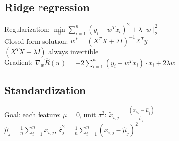 \subsection*{Ridge regression}
Regularization: $\underset{w}{\operatorname{min}} \sum \limits_{i=1}^n (y_i - w^Tx_i)^2 + \lambda ||w||_2^2$\\
Closed form solution: $w^*=(X^T X + \lambda I)^{-1} X^T y$\\
$(X^T X + \lambda I)$ always invertible.\\
Gradient: $\nabla_w \hat{R}(w) = -2 \sum \limits_{i=1}^n (y_i-w^T x_i) \cdot x_i + 2 \lambda w$


\subsection*{Standardization}
Goal: each feature: $\mu = 0$, unit $\sigma^2$: $\tilde{x}_{i,j} = \frac{(x_{i,j}-\hat{\mu}_j)}{\hat{\sigma}_j}$\\
$\hat{\mu}_j = \frac{1}{n}\sum_{i=1}^n x_{i,j}$, $\hat{\sigma}_j^2 = \frac{1}{n}\sum_{i=1}^n {(x_{i,j}-\hat{\mu}_j)}^2$ 





